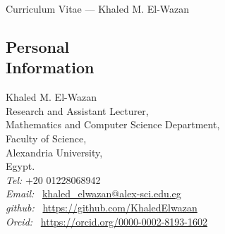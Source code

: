 \documentclass[margin,line]{resume}
\begin{document}
{\sc \Large Curriculum Vitae --- Khaled M. El-Wazan}
\begin{resume}
	\vspace{0.5cm}



	\section{Personal\\Information\mysidestyle}%
	Khaled M. El-Wazan \\
	Research and Assistant Lecturer,\\
	Mathematics and Computer Science Department,\\
	Faculty of Science,  \\
	Alexandria University, \\
	Egypt. \\
	\emph{Tel:} +20 01228068942\\
	\emph{Email:} ~\href{mailto:khaled\_elwazan@ alex-sci.edu.eg}{khaled\_elwazan@alex-sci.edu.eg}\\
	\emph{github:} ~\href{https://github.com/KhaledElwazan}{https://github.com/KhaledElwazan}\\
	\emph{Orcid:} ~\href{https://orcid.org/0000-0002-8193-1602}{https://orcid.org/0000-0002-8193-1602}







\end{resume}
\end{document}
